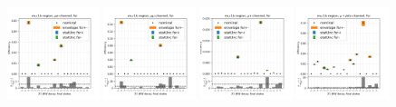 \begin{figure}
    \centering
    \includegraphics[width=0.24\textwidth]{chapters/Appendix/sectionTTSyst/figures/afterCorr/icata0_ch0_fsr.png}
    \includegraphics[width=0.24\textwidth]{chapters/Appendix/sectionTTSyst/figures/afterCorr/icata0_ch1_fsr.png}
    \includegraphics[width=0.24\textwidth]{chapters/Appendix/sectionTTSyst/figures/afterCorr/icata0_ch2_fsr.png}
    \includegraphics[width=0.24\textwidth]{chapters/Appendix/sectionTTSyst/figures/afterCorr/icata0_ch3_fsr.png}


\end{figure}
